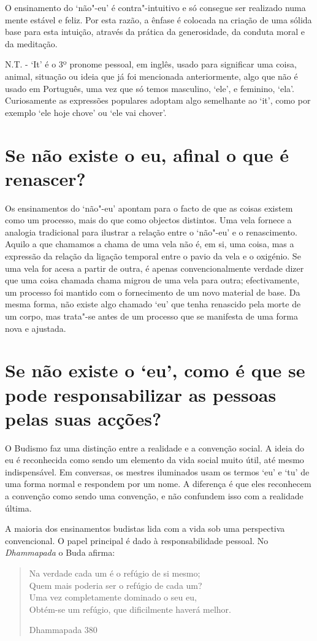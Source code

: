 O ensinamento do `não"-eu' é contra"-intuitivo e só consegue ser
realizado numa mente estável e feliz. Por esta razão, a ênfase é
colocada na criação de uma sólida base para esta intuição, através da
prática da generosidade, da conduta moral e da meditação.

N.T. - `It' é o 3º pronome pessoal, em inglês, usado para significar uma
coisa, animal, situação ou ideia que já foi mencionada anteriormente,
algo que não é usado em Português, uma vez que só temos masculino,
`ele', e feminino, `ela'. Curiosamente as expressões populares adoptam
algo semelhante ao `it', como por exemplo `ele hoje
chove' ou `ele vai chover'.

\section{Se não existe o eu, afinal o que é renascer?}

Os ensinamentos do `não"-eu' apontam para o facto de que as coisas
existem como um processo, mais do que como objectos distintos. Uma vela
fornece a analogia tradicional para ilustrar a relação entre o
`não"-eu' e o renascimento. Aquilo a que chamamos a chama de uma vela
não é, em si, uma coisa, mas a expressão da relação da ligação temporal
entre o pavio da vela e o oxigénio. Se uma vela for acesa a partir de
outra, é apenas convencionalmente verdade dizer que uma coisa chamada
chama migrou de uma vela para outra; efectivamente, um processo foi
mantido com o fornecimento de um novo material de base. Da mesma forma,
não existe algo chamado `eu' que tenha renascido pela morte de um
corpo, mas trata"-se antes de um processo que se manifesta de uma forma
nova e ajustada.

\section{Se não existe o `eu', como é que se pode responsabilizar as pessoas
  pelas suas acções?}

O Budismo faz uma distinção entre a realidade e a convenção social. A
ideia do eu é reconhecida como sendo um elemento da vida social muito
útil, até mesmo indispensável. Em conversas, os mestres iluminados usam
os termos `eu' e `tu' de uma forma normal e respondem por um nome. A
diferença é que eles reconhecem a convenção como sendo uma convenção, e
não confundem isso com a realidade última.

A maioria dos ensinamentos budistas lida com a vida sob uma perspectiva
convencional. O papel principal é dado à responsabilidade pessoal. No
\emph{Dhammapada} o Buda afirma:

\begin{verse}
  Na verdade cada um é o refúgio de si mesmo;\\
  Quem mais poderia ser o refúgio de cada um?\\
  Uma vez completamente dominado o seu eu,\\
  Obtém-se um refúgio, que dificilmente haverá melhor.

  Dhammapada 380
\end{verse}
